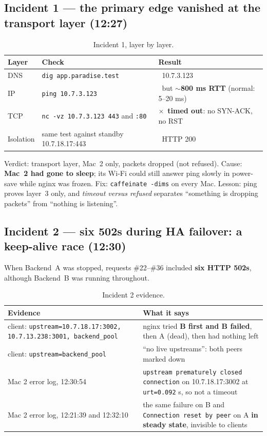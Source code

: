 \documentclass[11pt,a4paper]{article}
\newcommand{\ok}{\textcolor{lmGreen}{\checkmark}}
\newcommand{\bad}{\textcolor{lmRed}{$\times$}}
\begin{document}
\subsection{Incident 1 --- the primary edge vanished at the transport layer (12:27)}
\begin{table}[H]
\centering
\caption{Incident 1, layer by layer.}
{\small
\begin{tabular}{@{}L{2.0cm}L{6.0cm}L{6.2cm}@{}}
\toprule
\textbf{Layer} & \textbf{Check} & \textbf{Result} \\
\midrule
DNS & \texttt{dig app.paradise.test} & \ok\ 10.7.3.123 \\
IP & \texttt{ping 10.7.3.123} & \ok\ but $\sim$\textbf{800 ms RTT} (normal: 5--20 ms) \\
TCP & \texttt{nc -vz 10.7.3.123 443} and \texttt{:80} & \bad\ \textbf{timed out}: no SYN-ACK, no RST \\
Isolation & same test against standby 10.7.18.17:443 & \ok\ HTTP 200 \\
\bottomrule
\end{tabular}}
\end{table}
Verdict: transport layer, Mac~2 only, packets dropped (not refused). Cause: \textbf{Mac~2 had gone to
sleep}; its Wi-Fi could still answer ping slowly in power-save while nginx was frozen. Fix:
\texttt{caffeinate -dims} on every Mac. Lesson: ping proves layer~3 only, and \emph{timeout versus
refused} separates ``something is dropping packets'' from ``nothing is listening''.

\subsection{Incident 2 --- six 502s during HA failover: a keep-alive race (12:30)}
When Backend~A was stopped, requests \#22--\#36 included \textbf{six HTTP 502s}, although Backend~B
was running throughout.

\begin{table}[!htbp]
\centering
\caption{Incident 2 evidence.}
{\small
\begin{tabular}{@{}L{5.6cm}L{8.6cm}@{}}
\toprule
\textbf{Evidence} & \textbf{What it says} \\
\midrule
client: \texttt{upstream=10.7.18.17:3002, 10.7.13.238:3001, backend\_pool} & nginx tried \textbf{B first and B failed}, then A (dead), then had nothing left \\
client: \texttt{upstream=backend\_pool} & ``no live upstreams'': both peers marked down \\
Mac 2 error log, 12:30:54 & \texttt{upstream prematurely closed connection} on 10.7.18.17:3002 at \texttt{urt=0.092} s, so not a timeout \\
Mac 2 error log, 12:21:39 and 12:32:10 & the same failure on B and \texttt{Connection reset by peer} on A \textbf{in steady state}, invisible to clients \\
\bottomrule
\end{tabular}}
\end{table}
\end{document}
